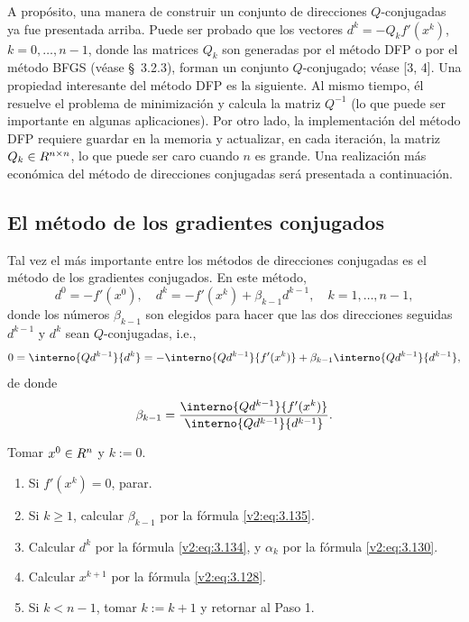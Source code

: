 A propósito, una manera de construir un conjunto de direcciones $Q$-conjugadas ya fue presentada arriba. Puede ser probado que los vectores $d^k = -Q_k f'(x^k)$, $k = 0, \dots, n-1$, donde las matrices $Q_k$ son generadas por el método DFP o por el método BFGS (véase \S~3.2.3), forman un conjunto $Q$-conjugado; véase [3, 4].
Una propiedad interesante del método DFP es la siguiente. Al mismo tiempo, él resuelve el problema de minimización y calcula la matriz $Q^{-1}$ (lo que puede ser importante en algunas aplicaciones). Por otro lado, la implementación del método DFP requiere guardar en la memoria y actualizar, en cada iteración, la matriz $Q_k \in R^{n \times n}$, lo que puede ser caro cuando $n$ es grande. Una realización más económica del método de direcciones conjugadas será presentada a continuación.

\subsection{El método de los gradientes conjugados}\label{v2:sec:3.4.2}

Tal vez el más importante entre los métodos de direcciones conjugadas es el método de los gradientes conjugados. En este método,
\begin{equation}
    d^0 = -f'(x^0), \quad d^k = -f'(x^k) + \beta_{k-1}d^{k-1}, \quad k = 1, \dots, n-1,
    \label{v2:eq:3.134}
\end{equation}
donde los números $\beta_{k-1}$ son elegidos para hacer que las dos direcciones seguidas $d^{k-1}$ y $d^k$ sean $Q$-conjugadas, i.e.,
\[
    0 = \interno{Qd^{k-1}}{d^k} = -\interno{Qd^{k-1}}{f'(x^k)} + \beta_{k-1}\interno{Qd^{k-1}}{d^{k-1}},
\]
de donde
\begin{equation}
    \beta_{k-1} = \frac{\interno{Qd^{k-1}}{f'(x^k)}}{\interno{Qd^{k-1}}{d^{k-1}}}.
    \label{v2:eq:3.135}
\end{equation}

\begin{algorithm}
    Tomar $x^0 \in R^n$ y $k := 0$.
\begin{enumerate}
    \item Si $f'(x^k) = 0$, parar.
    \item Si $k \ge 1$, calcular $\beta_{k-1}$ por la fórmula \eqref{v2:eq:3.135}.
    \item Calcular $d^k$ por la fórmula \eqref{v2:eq:3.134}, y $\alpha_k$ por la fórmula \eqref{v2:eq:3.130}.
    \item Calcular $x^{k+1}$ por la fórmula \eqref{v2:eq:3.128}.
    \item Si $k < n - 1$, tomar $k := k + 1$ y retornar al Paso 1.
\end{enumerate}
\end{algorithm}

